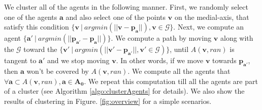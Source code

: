 We cluster all of the agents in the following manner. First, we randomly select one of the agents $\mathbf{a}$ and also select one of the points $\mathbf{v}$ on the medial-axis, that satisfy this condition $\{\mathbf{v}\ |\ argmin (||\mathbf{v} - \mathbf{p_{a}}||), \mathbf{v} \in \mathcal G\}$. 
Next, we compute an agent $\{\mathbf{a'}\ |\ argmin (||\mathbf{p_{a'}} - \mathbf{p_{a}}||)\}$. We compute a path by moving $\mathbf{v}$ along with the $\mathcal G$ toward the $\{\mathbf{v'}\ |\ argmin (||\mathbf{v'} - \mathbf{p_{a'}}||,\mathbf{v'} \in \mathcal{G})\}$, until $A(\mathbf{v},ran)$ is tangent to $\mathbf{a'}$ and we stop moving $\mathbf{v}$. In other words, if we move $\mathbf{v}$ towards $\mathbf{p_{a'}}$, then $\mathbf{a}$ won't be covered by $A(\mathbf{v},ran)$.
We compute all the agents that $\forall \mathbf{a} \subset A(\mathbf{v},ran), \mathbf{a} \in \mathbf{A_0}$. We repeat this computation till all the  agents are part of a cluster (see Algorithm \ref{algo:clusterAgents} for details). We also show the results of  clustering in Figure. \ref{fig:overview} for a simple scenarios.

